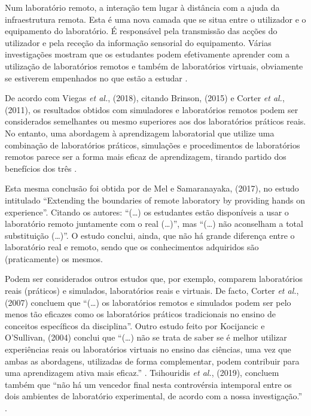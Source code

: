 Num \acrshort{laboratório remoto}, a interação tem lugar à distância com a ajuda da infraestrutura remota. Esta é uma nova camada que se situa entre o utilizador e o equipamento do laboratório. É responsável pela transmissão das acções do utilizador e pela receção da informação sensorial do equipamento.
Várias investigações mostram que os estudantes podem efetivamente aprender com a utilização de laboratórios remotos e também de laboratórios virtuais, obviamente se estiverem empenhados no que estão a estudar \cite{RemoteLabsImpactVISIR}.

De acordo com Viegas \textit{et al.}, (2018)\cite{ImpactRemoteLabTeachingPractices}, citando Brinson, (2015)\cite{BRINSON2015218} e Corter \textit{et al.}, (2011)\cite{CORTER20112054}, os resultados obtidos com simuladores e laboratórios remotos podem ser considerados semelhantes ou mesmo superiores aos dos laboratórios práticos reais. No entanto, uma abordagem à aprendizagem laboratorial que utilize uma combinação de laboratórios práticos, simulações e procedimentos de laboratórios remotos parece ser a forma mais eficaz de aprendizagem, tirando partido dos benefícios dos três \cite{BRINSON2015218}.

Esta mesma conclusão foi obtida por de Mel e Samaranayaka, (2017), no estudo intitulado ``Extending the boundaries of remote laboratory by providing hands on experience''. Citando os autores: ``(\ldots) os estudantes estão disponíveis a usar o \acrshort{laboratório remoto} juntamente com o real (\ldots)'', mas ``(\ldots) não aconselham a total substituição (\ldots)''. O estudo conclui, ainda, que não há grande diferença entre o laboratório real e remoto, sendo que os conhecimentos adquiridos são (praticamente) os mesmos\cite{deMel}.

Podem ser considerados outros estudos que, por exemplo, comparem laboratórios reais (práticos) e simulados, laboratórios reais e virtuais. De facto, Corter \textit{et al.}, (2007) concluem que ``(\ldots) os laboratórios remotos e simulados podem ser pelo menos tão eficazes como os laboratórios práticos tradicionais no ensino de conceitos específicos da disciplina''\cite{StudyRemoteHandsonSimulatedLabs}. Outro estudo feito por Kocijancic e O'Sullivan, (2004) conclui que ``(\ldots) não se trata de saber se é melhor utilizar experiências reais ou laboratórios virtuais no ensino das ciências, uma vez que ambas as abordagens, utilizadas de forma complementar, podem contribuir para uma aprendizagem ativa mais eficaz.'' \cite{RealorVirtualDilema}. Tsihouridis \textit{et al.}, (2019), concluem também que ``não há um vencedor final nesta controvérsia intemporal entre os dois ambientes de laboratório experimental, de acordo com a nossa investigação.'' \cite{controversy}.


